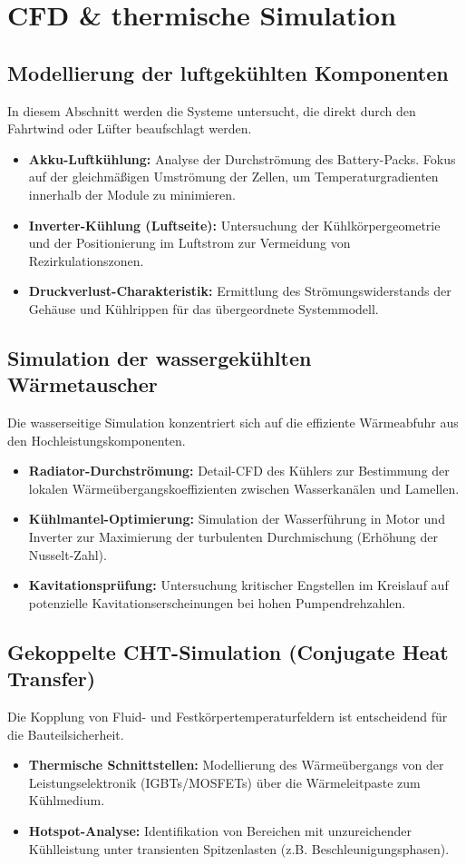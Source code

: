 \section{CFD \& thermische Simulation}

\subsection{Modellierung der luftgekühlten Komponenten}
In diesem Abschnitt werden die Systeme untersucht, die direkt durch den Fahrtwind oder Lüfter beaufschlagt werden.
\begin{itemize}
    \item \textbf{Akku-Luftkühlung:} Analyse der Durchströmung des Battery-Packs. Fokus auf der gleichmäßigen Umströmung der Zellen, um Temperaturgradienten innerhalb der Module zu minimieren.
    \item \textbf{Inverter-Kühlung (Luftseite):} Untersuchung der Kühlkörpergeometrie und der Positionierung im Luftstrom zur Vermeidung von Rezirkulationszonen.
    \item \textbf{Druckverlust-Charakteristik:} Ermittlung des Strömungswiderstands der Gehäuse und Kühlrippen für das übergeordnete Systemmodell.
\end{itemize}

\subsection{Simulation der wassergekühlten Wärmetauscher}
Die wasserseitige Simulation konzentriert sich auf die effiziente Wärmeabfuhr aus den Hochleistungskomponenten.
\begin{itemize}
    \item \textbf{Radiator-Durchströmung:} Detail-CFD des Kühlers zur Bestimmung der lokalen Wärmeübergangskoeffizienten zwischen Wasserkanälen und Lamellen.
    \item \textbf{Kühlmantel-Optimierung:} Simulation der Wasserführung in Motor und Inverter zur Maximierung der turbulenten Durchmischung (Erhöhung der Nusselt-Zahl).
    \item \textbf{Kavitationsprüfung:} Untersuchung kritischer Engstellen im Kreislauf auf potenzielle Kavitationserscheinungen bei hohen Pumpendrehzahlen.
\end{itemize}

\subsection{Gekoppelte CHT-Simulation (Conjugate Heat Transfer)}
Die Kopplung von Fluid- und Festkörpertemperaturfeldern ist entscheidend für die Bauteilsicherheit.
\begin{itemize}
    \item \textbf{Thermische Schnittstellen:} Modellierung des Wärmeübergangs von der Leistungselektronik (IGBTs/MOSFETs) über die Wärmeleitpaste zum Kühlmedium.
    \item \textbf{Hotspot-Analyse:} Identifikation von Bereichen mit unzureichender Kühlleistung unter transienten Spitzenlasten (z.B. Beschleunigungsphasen).
\end{itemize}

